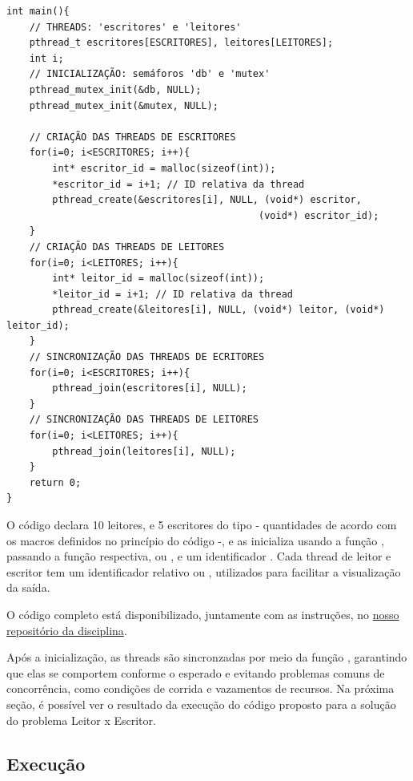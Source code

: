 \documentclass[
	12pt,				%
	openright,			%
	oneside,			%
	a4paper,			%
	chapter=TITLE,		%
	english,			%
	french,				%
	spanish,			%
	brazil				%
	]{abntex2}
\theoremstyle{definition}
\begin{document}
\begin{verbatim}
int main(){
    // THREADS: 'escritores' e 'leitores'
    pthread_t escritores[ESCRITORES], leitores[LEITORES];
    int i;
    // INICIALIZAÇÃO: semáforos 'db' e 'mutex'
    pthread_mutex_init(&db, NULL);
    pthread_mutex_init(&mutex, NULL);

    // CRIAÇÃO DAS THREADS DE ESCRITORES
    for(i=0; i<ESCRITORES; i++){
        int* escritor_id = malloc(sizeof(int));
        *escritor_id = i+1; // ID relativa da thread 
        pthread_create(&escritores[i], NULL, (void*) escritor, 
                                            (void*) escritor_id);
    }
    // CRIAÇÃO DAS THREADS DE LEITORES
    for(i=0; i<LEITORES; i++){
        int* leitor_id = malloc(sizeof(int));
        *leitor_id = i+1; // ID relativa da thread
        pthread_create(&leitores[i], NULL, (void*) leitor, (void*) leitor_id);
    }
    // SINCRONIZAÇÃO DAS THREADS DE ECRITORES
    for(i=0; i<ESCRITORES; i++){
        pthread_join(escritores[i], NULL);
    }
    // SINCRONIZAÇÃO DAS THREADS DE LEITORES
    for(i=0; i<LEITORES; i++){
        pthread_join(leitores[i], NULL);
    }
    return 0;
}
\end{verbatim}

O código declara 10 leitores,  e 5 escritores  do tipo  - quantidades de acordo com os macros definidos no princípio do código -, e as inicializa usando a função , passando a função respectiva,  ou , e um identificador . Cada thread de leitor e escritor tem um identificador relativo  ou , utilizados para facilitar a visualização da saída. 

O código completo está disponibilizado, juntamente com as instruções, no \href{https://github.com/jvictorferreira3301/Sistemas_Operacionais}{nosso repositório da disciplina}.

Após a inicialização, as threads são sincronzadas por meio da função , garantindo que elas se comportem conforme o esperado e evitando problemas comuns de concorrência, como condições de corrida e vazamentos de recursos. Na próxima seção, é possível ver o resultado da execução do código proposto para a solução do problema Leitor x Escritor.

\subsection{Execução}
\end{document}
